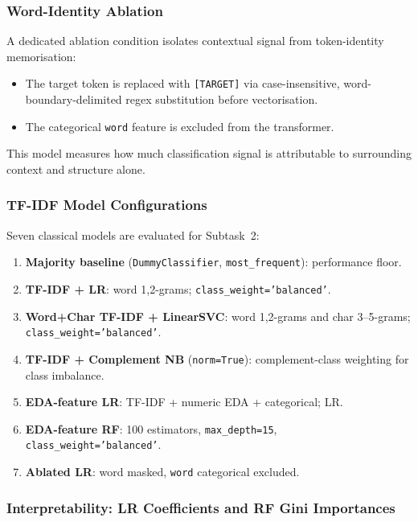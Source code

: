 \subsubsection{Word-Identity Ablation}
\label{sec:baselines:ablation}

A dedicated ablation condition isolates contextual signal from token-identity
memorisation:
\begin{itemize}
  \item The target token is replaced with \texttt{[TARGET]} via case-insensitive,
    word-boundary-delimited regex substitution before vectorisation.
  \item The categorical \texttt{word} feature is excluded from the transformer.
\end{itemize}
This model measures how much classification signal is attributable to
surrounding context and structure alone.

\subsubsection{TF-IDF Model Configurations}

Seven classical models are evaluated for Subtask~2:
\begin{enumerate}
  \item \textbf{Majority baseline} (\texttt{DummyClassifier},
    \texttt{most\_frequent}): performance floor.
  \item \textbf{TF-IDF + LR}: word 1,2-grams; \texttt{class\_weight='balanced'}.
  \item \textbf{Word+Char TF-IDF + LinearSVC}: word 1,2-grams and
    char 3--5-grams; \texttt{class\_weight='balanced'}.
  \item \textbf{TF-IDF + Complement NB} (\texttt{norm=True}): complement-class
    weighting for class imbalance.
  \item \textbf{EDA-feature LR}: TF-IDF + numeric EDA + categorical; LR.
  \item \textbf{EDA-feature RF}: 100 estimators, \texttt{max\_depth=15},
    \texttt{class\_weight='balanced'}.
  \item \textbf{Ablated LR}: word masked, \texttt{word} categorical excluded.
\end{enumerate}

\subsubsection{Interpretability: LR Coefficients and RF Gini Importances}
\label{sec:baselines:interpret}

